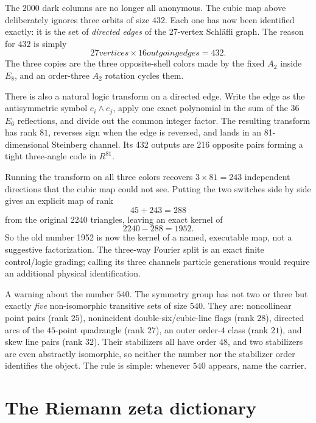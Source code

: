 \documentclass[11pt]{article}
\def\mathbb#1{#1}%
\def\textbf#1{#1}%
\def\text#1{#1}%
\begin{document}
\begin{mathnote}
\textbf{The $2000$ dark columns are no longer all anonymous.}
The cubic map above deliberately ignores three orbits of size $432$.
Each one has now been identified exactly: it is the set of \emph{directed
edges} of the 27-vertex Schl\"afli graph.  The reason for $432$ is simply
\[
27\text{ vertices}\times16\text{ outgoing edges}=432.
\]
The three copies are the three opposite-shell colors made by the fixed
$A_2$ inside $E_8$, and an order-three $A_2$ rotation cycles them.

There is also a natural logic transform on a directed edge.  Write the
edge as the antisymmetric symbol $e_i\wedge e_j$, apply one exact
polynomial in the sum of the 36 $E_6$ reflections, and divide out the
common integer factor.  The resulting transform has rank $81$, reverses
sign when the edge is reversed, and lands in an 81-dimensional
Steinberg channel.  Its 432 outputs are 216 opposite pairs forming a
tight three-angle code in $\mathbb R^{81}$.

Running the transform on all three colors recovers $3\times81=243$
independent directions that the cubic map could not see.  Putting the
two switches side by side gives an explicit map of rank
\[
45+243=288
\]
from the original 2240 triangles, leaving an exact kernel of
\[
2240-288=1952.
\]
So the old number 1952 is now the kernel of a named, executable map,
not a suggestive factorization.  The three-way Fourier split is an exact
finite control/logic grading; calling its three channels particle
generations would require an additional physical identification.
\end{mathnote}

\begin{mathnote}
\textbf{A warning about the number $540$.} %
The symmetry group has not two or three but exactly \emph{five}
non-isomorphic transitive sets of size $540$. %
They are: noncollinear
point pairs (rank $25$), nonincident double-six/cubic-line flags
(rank $28$), directed arcs of the $45$-point quadrangle (rank $27$),
an outer order-$4$ class (rank $21$), and skew line pairs (rank $32$).
Their stabilizers all have order $48$, and two stabilizers are even
abstractly isomorphic, so neither the number nor the stabilizer order
identifies the object.  The rule is simple: whenever $540$ appears, name %
the carrier.
\end{mathnote}

\section{The Riemann zeta dictionary}
\label{sec:zeta-dict}
\end{document}
